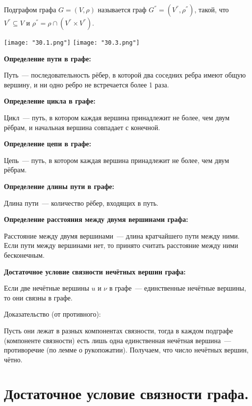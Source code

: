     Подграфом графа $G = (V, \rho)$ называется граф $G^{''} = (V^{''}, \rho^{''})$, 
    такой, что $V^{''} \subseteq V$ и $\rho^{''} = \rho \cap (V^{''} \times V^{''})$.
    \bigskip

    \begin{center}
        \texttt{[image: "30.1.png"]}
        \texttt{[image: "30.3.png"]}
    \end{center}
    \bigskip

\textbf{Определение пути в графе:}
    \smallskip
    
    Путь~--- последовательность рёбер, в которой два соседних ребра имеют
    общую вершину, и ни одно ребро не встречается более 1 раза.
    \bigskip

\textbf{Определение цикла в графе:}
    \smallskip
    
    Цикл~--- путь, в котором каждая вершина принадлежит не более, чем двум
    рёбрам, и начальная вершина совпадает с конечной.
    \bigskip

\textbf{Определение цепи в графе:}
    \smallskip
    
    Цепь~--- путь, в котором каждая вершина принадлежит не более, чем двум рёбрам.
    \bigskip

\textbf{Определение длины пути в графе:}    
    \smallskip

    Длина пути~--- количество рёбер, входящих в путь.
    \bigskip

\textbf{Определение расстояния между двумя вершинами графа:}
    \smallskip
    
    Расстояние между двумя вершинами~--- длина кратчайшего пути между ними. Если
    пути между вершинами нет, то принято считать расстояние между ними бесконечным.
    \bigskip

\textbf{Достаточное условие связности нечётных вершин графа:}
    \smallskip
    
    Если две нечётные вершины $u$ и $\nu$ в графе~--- единственные нечётные вершины,
    то они связны в графе.
    \bigskip

    Доказательство (от противного):
    \bigskip

    Пусть они лежат в разных компонентах связности, тогда в каждом подграфе
    (компоненте связности) есть лишь одна единственная нечётная вершина~--- 
    противоречие (по лемме о рукопожатии). Получаем, что число нечётных вершин,
    чётно.

\section{Достаточное условие связности графа.}

